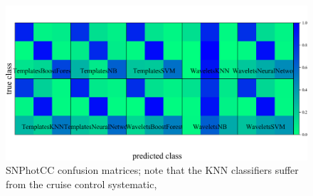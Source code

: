 \begin{figure}
	\begin{center}
    \includegraphics[width=\textwidth]{./fig/all_snphotcc_cm.png}
		\caption{SNPhotCC confusion matrices; note that the KNN classifiers suffer from the cruise control systematic, }
		\label{fig:snphotcc_cm}
	\end{center}
\end{figure}



%
